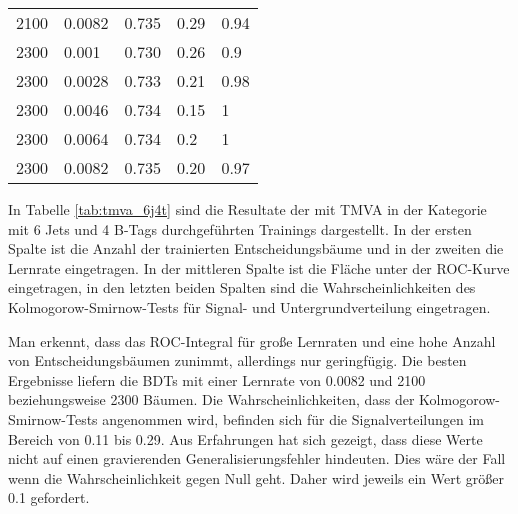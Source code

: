 \begin{table}[tbp]
\begin{center}
\begin{tabular}{lllll}
 \num{2100}  & \num{0,0082}  & \num{0,735} & \num{0,29} & \num{0,94}\\
 \num{2300}  & \num{0,001}   & \num{0,730} & \num{0,26} & \num{0,9}\\
 \num{2300}  & \num{0,0028}  & \num{0,733} & \num{0,21} & \num{0,98}\\
 \num{2300}  & \num{0,0046}  & \num{0,734} & \num{0,15} & \num{1}\\
 \num{2300}  & \num{0,0064}  & \num{0,734} & \num{0,2}  & \num{1}\\
 \num{2300}  & \num{0,0082}  & \num{0,735} & \num{0,20} & \num{0,97}\\
  \hline
  \end{tabular}
  \end{center}
\end{table}

In Tabelle \ref{tab:tmva_6j4t} sind die Resultate der mit TMVA in der Kategorie mit 6 Jets und 4 B-Tags durchgef\"uhrten Trainings dargestellt. In der ersten Spalte ist die Anzahl der trainierten Entscheidungsb\"aume und in der zweiten die Lernrate eingetragen. In der mittleren Spalte ist die Fl\"ache unter der ROC-Kurve eingetragen, in den letzten beiden Spalten sind die Wahrscheinlichkeiten des Kolmogorow-Smirnow-Tests f\"ur Signal- und Untergrundverteilung eingetragen.

Man erkennt, dass das ROC-Integral f\"ur gro\ss e Lernraten und eine hohe Anzahl von Entscheidungsb\"aumen zunimmt, allerdings nur geringf\"ugig. Die besten Ergebnisse liefern die BDTs mit einer Lernrate von \num{0,0082} und 2100 beziehungsweise 2300 B\"aumen. Die Wahrscheinlichkeiten, dass der Kolmogorow-Smirnow-Tests angenommen wird, befinden sich f\"ur die Signalverteilungen im Bereich von \num{0,11} bis \num{0,29}. Aus Erfahrungen hat sich gezeigt, dass diese Werte nicht auf einen gravierenden Generalisierungsfehler hindeuten. Dies w\"are der Fall wenn die Wahrscheinlichkeit gegen Null geht. Daher wird jeweils ein Wert gr\"o\ss er \num{0,1} gefordert.

